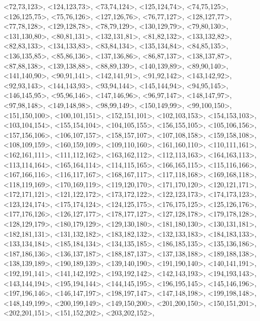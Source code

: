 \documentclass[a4paper,10pt]{article}
\begin{document}
\begin{eulernotebook}
\begin{euleroutput}
  <72,73,123>,
  <124,123,73>,
  <73,74,124>,
  <125,124,74>,
  <74,75,125>,
  <126,125,75>,
  <75,76,126>,
  <127,126,76>,
  <76,77,127>,
  <128,127,77>,
  <77,78,128>,
  <129,128,78>,
  <78,79,129>,
  <130,129,79>,
  <79,80,130>,
  <131,130,80>,
  <80,81,131>,
  <132,131,81>,
  <81,82,132>,
  <133,132,82>,
  <82,83,133>,
  <134,133,83>,
  <83,84,134>,
  <135,134,84>,
  <84,85,135>,
  <136,135,85>,
  <85,86,136>,
  <137,136,86>,
  <86,87,137>,
  <138,137,87>,
  <87,88,138>,
  <139,138,88>,
  <88,89,139>,
  <140,139,89>,
  <89,90,140>,
  <141,140,90>,
  <90,91,141>,
  <142,141,91>,
  <91,92,142>,
  <143,142,92>,
  <92,93,143>,
  <144,143,93>,
  <93,94,144>,
  <145,144,94>,
  <94,95,145>,
  <146,145,95>,
  <95,96,146>,
  <147,146,96>,
  <96,97,147>,
  <148,147,97>,
  <97,98,148>,
  <149,148,98>,
  <98,99,149>,
  <150,149,99>,
  <99,100,150>,
  <151,150,100>,
  <100,101,151>,
  <152,151,101>,
  <102,103,153>,
  <154,153,103>,
  <103,104,154>,
  <155,154,104>,
  <104,105,155>,
  <156,155,105>,
  <105,106,156>,
  <157,156,106>,
  <106,107,157>,
  <158,157,107>,
  <107,108,158>,
  <159,158,108>,
  <108,109,159>,
  <160,159,109>,
  <109,110,160>,
  <161,160,110>,
  <110,111,161>,
  <162,161,111>,
  <111,112,162>,
  <163,162,112>,
  <112,113,163>,
  <164,163,113>,
  <113,114,164>,
  <165,164,114>,
  <114,115,165>,
  <166,165,115>,
  <115,116,166>,
  <167,166,116>,
  <116,117,167>,
  <168,167,117>,
  <117,118,168>,
  <169,168,118>,
  <118,119,169>,
  <170,169,119>,
  <119,120,170>,
  <171,170,120>,
  <120,121,171>,
  <172,171,121>,
  <121,122,172>,
  <173,172,122>,
  <122,123,173>,
  <174,173,123>,
  <123,124,174>,
  <175,174,124>,
  <124,125,175>,
  <176,175,125>,
  <125,126,176>,
  <177,176,126>,
  <126,127,177>,
  <178,177,127>,
  <127,128,178>,
  <179,178,128>,
  <128,129,179>,
  <180,179,129>,
  <129,130,180>,
  <181,180,130>,
  <130,131,181>,
  <182,181,131>,
  <131,132,182>,
  <183,182,132>,
  <132,133,183>,
  <184,183,133>,
  <133,134,184>,
  <185,184,134>,
  <134,135,185>,
  <186,185,135>,
  <135,136,186>,
  <187,186,136>,
  <136,137,187>,
  <188,187,137>,
  <137,138,188>,
  <189,188,138>,
  <138,139,189>,
  <190,189,139>,
  <139,140,190>,
  <191,190,140>,
  <140,141,191>,
  <192,191,141>,
  <141,142,192>,
  <193,192,142>,
  <142,143,193>,
  <194,193,143>,
  <143,144,194>,
  <195,194,144>,
  <144,145,195>,
  <196,195,145>,
  <145,146,196>,
  <197,196,146>,
  <146,147,197>,
  <198,197,147>,
  <147,148,198>,
  <199,198,148>,
  <148,149,199>,
  <200,199,149>,
  <149,150,200>,
  <201,200,150>,
  <150,151,201>,
  <202,201,151>,
  <151,152,202>,
  <203,202,152>,

\end{euleroutput}
\end{eulernotebook}
\end{document}
